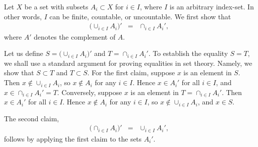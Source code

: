 \documentclass[12pt]{article}
\begin{document}
Let $X$ be a set with subsets $A_i \subset X$ for $i\in I$, where
$I$ is an arbitrary index-set. In other words, $I$ can be finite, 
countable, or uncountable. We first show that 
\begin{eqnarray*}
\displaystyle \big( \cup_{i\in I} A_i \big)' &=& \cap_{i\in I} A_i',
\end{eqnarray*}
where $A'$ denotes the complement of $A$. 

Let us define $S=\big( \cup_{i\in I} A_i \big)'$ 
and $T=\cap_{i\in I} A_i'$. To establish the equality $S=T$, we shall 
use a standard argument for proving equalities in set theory. Namely, 
we show that $S\subset T$ and $T\subset S$. 
For the first claim, suppose $x$ is an 
element in $S$. 
Then $x\notin \cup_{i\in I} A_i$, so $x\notin A_i$ for any $i\in I$. 
Hence $x\in A_i'$ for all $i\in I$, and $x\in \cap_{i\in I} A_i'=T$. 
Conversely, suppose $x$ is an 
element in $T=\cap_{i\in I} A_i'$. Then  $x\in A_i'$ for all $i\in I$. 
Hence $x\notin A_i$ for any $i\in I$, so $x\notin \cup_{i\in I} A_i$,
and $x\in S$. 

The second claim,
\begin{eqnarray*}
\big( \cap_{i\in I} A_i \big)' &=& \cup_{i\in I} A_i',
\end{eqnarray*}
follows by applying the first claim to the sets $A_i'$.
\end{document}
